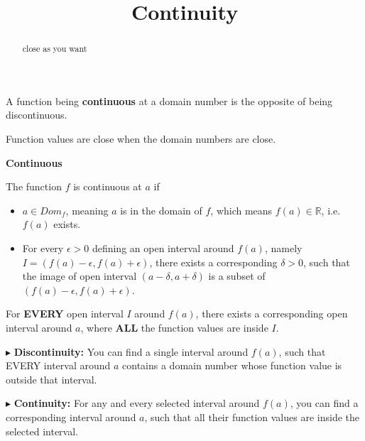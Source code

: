 \documentclass{ximera}
\title{Continuity}
\begin{document}
\begin{abstract}
close as you want
\end{abstract}
\maketitle






A function being \textbf{continuous} at a domain number is the opposite of being discontinuous. 


Function values are close when the domain numbers are close.










\begin{definition} \textbf{\textcolor{green!50!black}{Continuous}}

The function $f$ is continuous at $a$ if


\begin{itemize}
\item $a \in Dom_f$, meaning $a$ is in the domain of $f$, which means $f(a) \in \mathbb{R}$, i.e. $f(a)$ exists.
\item For every $\epsilon > 0$ defining an open interval around $f(a)$, namely $I = (f(a) - \epsilon, f(a) + \epsilon)$, there exists a corresponding $\delta > 0$, such that the image of open interval $(a - \delta, a + \delta)$ is a subset of $(f(a)-\epsilon, f(a)+\epsilon)$.
\end{itemize}


For \textbf{\textcolor{red!70!black}{EVERY}} open interval $I$ around $f(a)$, there exists a corresponding open interval around $a$, where \textbf{\textcolor{red!70!black}{ALL}} the function values are inside $I$.


\end{definition}





$\blacktriangleright$ \textbf{Discontinuity:}  You can find a single interval around $f(a)$, such that EVERY interval around $a$ contains a domain number whose function value is outside that interval.


$\blacktriangleright$ \textbf{Continuity:} For any and every selected interval around $f(a)$, you can find a corresponding interval around $a$, such that all their function values are inside the selected interval.
\end{document}
